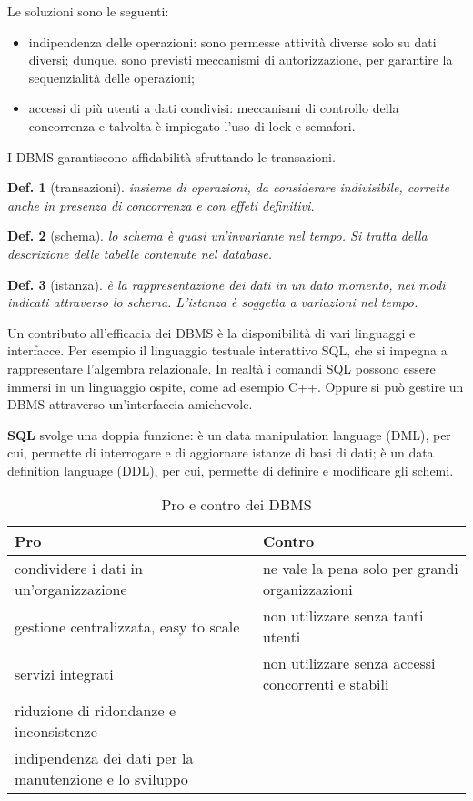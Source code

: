 \documentclass{article}
\newtheorem{definition}{Def.}[section]
\begin{document}
Le soluzioni sono le seguenti:
\begin{itemize}

	\item indipendenza delle operazioni: sono permesse attività diverse
		solo su dati diversi; dunque, sono previsti meccanismi di
		autorizzazione, per garantire la sequenzialità delle operazioni;

	\item accessi di più utenti a dati condivisi: meccanismi di controllo della
		concorrenza e talvolta è impiegato l'uso di lock e semafori.
\end{itemize}

I DBMS garantiscono affidabilità sfruttando le transazioni.

\begin{definition}[transazioni]
	insieme di operazioni, da considerare indivisibile, corrette anche in 
	presenza di concorrenza e con effeti definitivi.
\end{definition}

\begin{definition}[schema]
	lo schema è quasi un'invariante nel tempo. Si tratta della descrizione delle
	tabelle contenute nel database.
\end{definition}

\begin{definition}[istanza]
	è la rappresentazione dei dati in un dato momento, nei modi indicati
	attraverso lo schema. L'istanza è soggetta a variazioni nel tempo.
\end{definition}

Un contributo all'efficacia dei DBMS è la disponibilità di vari linguaggi e
interfacce. Per esempio il linguaggio testuale interattivo SQL, che si impegna a
rappresentare l'algembra relazionale. In realtà i comandi SQL possono essere
immersi in un linguaggio ospite, come ad esempio C++. Oppure si può gestire un
DBMS attraverso un'interfaccia amichevole.

\textbf{SQL} svolge una doppia funzione: è un data manipulation language (DML),
per cui, permette di interrogare e di aggiornare istanze di basi di dati; è un
data definition language (DDL), per cui, permette di definire e modificare gli
schemi.

\begin{table}[h]
	\label{tab:pro_contro_DBMS}
	\center
	\begin{tabular}{l l}
		\textbf{Pro} & \textbf{Contro} \\
		\hline
		condividere i dati in un'organizzazione & ne vale la pena solo per
		grandi organizzazioni \\
		gestione centralizzata, easy to scale & non utilizzare senza tanti
		utenti \\
		servizi integrati & non utilizzare senza accessi concorrenti e stabili
		\\
		riduzione di ridondanze e inconsistenze & \\
		indipendenza dei dati per la manutenzione e lo sviluppo & \\
	\end{tabular}
	\caption{Pro e contro dei DBMS}
\end{table}
\end{document}
